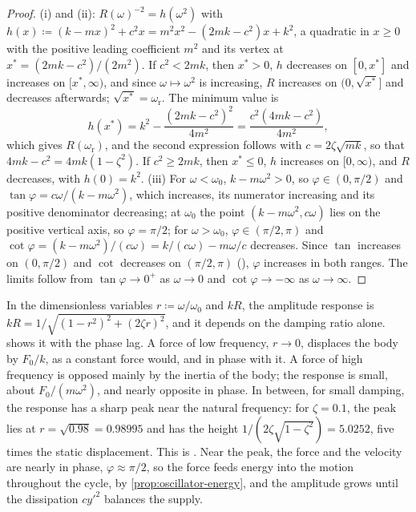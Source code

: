 \begin{proof}
(i) and (ii): $R(\omega)^{-2}=h(\omega^2)$ with $h(x)\coloneqq(k-mx)^2+c^2x=m^2x^2-(2mk-c^2)x+k^2$, a quadratic in $x\ge0$ with the positive leading coefficient $m^2$ and its vertex at $x^*=(2mk-c^2)/(2m^2)$. If $c^2<2mk$, then $x^*>0$, $h$ decreases on $[0,x^*]$ and increases on $[x^*,\infty)$, and since $\omega\mapsto\omega^2$ is increasing, $R$ increases on $(0,\sqrt{x^*}]$ and decreases afterwards; $\sqrt{x^*}=\omega_{\mathrm r}$. The minimum value is
\[
h(x^*)=k^2-\frac{(2mk-c^2)^2}{4m^2}=\frac{c^2(4mk-c^2)}{4m^2},
\]
which gives $R(\omega_{\mathrm r})$, and the second expression follows with $c=2\zeta\sqrt{mk}$, so that $4mk-c^2=4mk(1-\zeta^2)$. If $c^2\ge2mk$, then $x^*\le0$, $h$ increases on $[0,\infty)$, and $R$ decreases, with $h(0)=k^2$. (iii) For $\omega<\omega_0$, $k-m\omega^2>0$, so $\varphi\in(0,\pi/2)$ and $\tan\varphi=c\omega/(k-m\omega^2)$, which increases, its numerator increasing and its positive denominator decreasing; at $\omega_0$ the point $(k-m\omega^2,c\omega)$ lies on the positive vertical axis, so $\varphi=\pi/2$; for $\omega>\omega_0$, $\varphi\in(\pi/2,\pi)$ and $\cot\varphi=(k-m\omega^2)/(c\omega)=k/(c\omega)-m\omega/c$ decreases. Since $\tan$ increases on $(0,\pi/2)$ and $\cot$ decreases on $(\pi/2,\pi)$ (), $\varphi$ increases in both ranges. The limits follow from $\tan\varphi\to0^+$ as $\omega\to0$ and $\cot\varphi\to-\infty$ as $\omega\to\infty$.
\end{proof}

In the dimensionless variables $r\coloneqq\omega/\omega_0$ and $kR$, the amplitude response is $kR=1/\sqrt{(1-r^2)^2+(2\zeta r)^2}$, and it depends on the damping ratio alone.  shows it with the phase lag. A force of low frequency, $r\to0$, displaces the body by $F_0/k$, as a constant force would, and in phase with it. A force of high frequency is opposed mainly by the inertia of the body; the response is small, about $F_0/(m\omega^2)$, and nearly opposite in phase. In between, for small damping, the response has a sharp peak near the natural frequency: for $\zeta=0.1$, the peak lies at $r=\sqrt{0.98}=0.98995$ and has the height $1/(2\zeta\sqrt{1-\zeta^2})=5.0252$, five times the static displacement. This is . Near the peak, the force and the velocity are nearly in phase, $\varphi\approx\pi/2$, so the force feeds energy into the motion throughout the cycle, by \cref{prop:oscillator-energy}, and the amplitude grows until the dissipation $cy'^2$ balances the supply.

